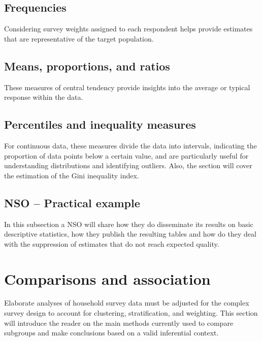 \documentclass[
  12pt,
]{book}
\begin{document}
\hypertarget{frequencies}{%
\section{Frequencies}\label{frequencies}}

Considering survey weights assigned to each respondent helps provide estimates that are representative of the target population.

\hypertarget{means-proportions-and-ratios}{%
\section{Means, proportions, and ratios}\label{means-proportions-and-ratios}}

These measures of central tendency provide insights into the average or typical response within the data.

\hypertarget{percentiles-and-inequality-measures}{%
\section{Percentiles and inequality measures}\label{percentiles-and-inequality-measures}}

For continuous data, these measures divide the data into intervals, indicating the proportion of data points below a certain value, and are particularly useful for understanding distributions and identifying outliers. Also, the section will cover the estimation of the Gini inequality index.

\hypertarget{nso-practical-example}{%
\section{NSO -- Practical example}\label{nso-practical-example}}

In this subsection a NSO will share how they do disseminate its results on basic descriptive statistics, how they publish the resulting tables and how do they deal with the suppression of estimates that do not reach expected quality.

\hypertarget{comparisons-and-association}{%
\chapter{Comparisons and association}\label{comparisons-and-association}}

Elaborate analyses of household survey data must be adjusted for the complex survey design to account for clustering, stratification, and weighting. This section will introduce the reader on the main methods currently used to compare subgroups and make conclusions based on a valid inferential context.
\end{document}
